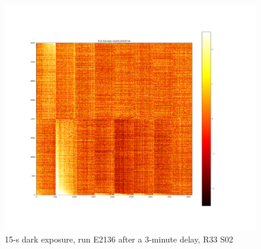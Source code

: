 \begin{figure}[htbp]
\vspace{0.5cm}

\begin{minipage}{0.45\textwidth}
    \centering
    \includegraphics[width=\textwidth]{sections/figures/E2136_dark15_delay_R33_S02.png}
    \caption{15-s dark exposure, run E2136 after a 3-minute delay, R33 S02}
\end{minipage}
\hfill
\begin{minipage}{0.45\textwidth}
    \centering
\end{minipage}
\end{figure}

%
%

